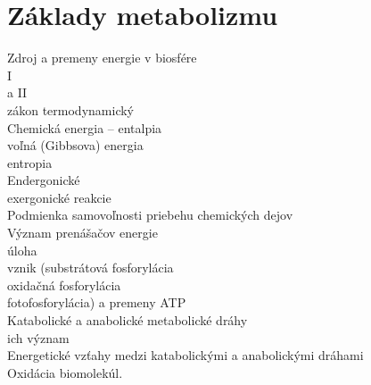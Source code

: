 \section{Základy metabolizmu}
Zdroj a premeny energie v biosfére\\
I\\
a II\\
zákon termodynamický\\
Chemická energia -- entalpia\\
\tab voľná (Gibbsova) energia\\
\tab entropia\\
Endergonické\\
\tab exergonické reakcie\\
Podmienka samovoľnosti priebehu chemických dejov\\
Význam prenášačov energie\\
\tab úloha\\
\tab vznik (substrátová fosforylácia\\
\tab oxidačná fosforylácia\\
\tab fotofosforylácia) a premeny ATP\\
Katabolické a anabolické metabolické dráhy\\
\tab ich význam\\
Energetické vzťahy medzi katabolickými a anabolickými dráhami\\
Oxidácia biomolekúl.\\
\\

